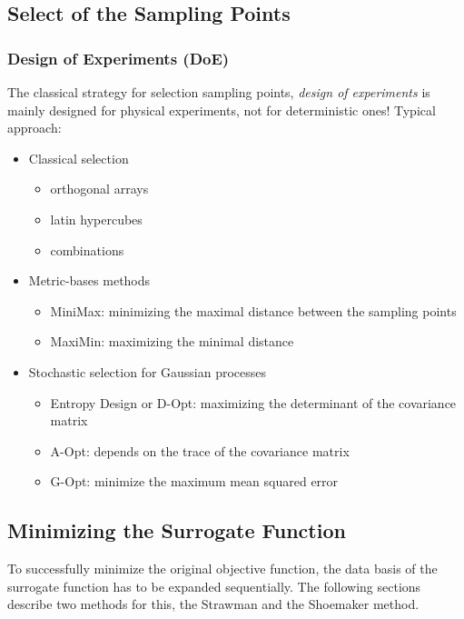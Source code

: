 		\subsection{Select of the Sampling Points}
			\subsubsection{Design of Experiments (DoE)}
				The classical strategy for selection sampling points, \emph{design of experiments} is mainly designed for physical experiments, not for deterministic ones! Typical approach:
				\begin{itemize}
					\item Classical selection
						\begin{itemize}
							\item orthogonal arrays
							\item latin hypercubes
							\item combinations
						\end{itemize}
					\item Metric-bases methods
						\begin{itemize}
							\item MiniMax: minimizing the maximal distance between the sampling points
							\item MaxiMin: maximizing the minimal distance
						\end{itemize}
					\item Stochastic selection for Gaussian processes
						\begin{itemize}
							\item Entropy Design or D-Opt: maximizing the determinant of the covariance matrix
							\item A-Opt: depends on the trace of the covariance matrix
							\item G-Opt: minimize the maximum mean squared error
						\end{itemize}
				\end{itemize}

		\subsection{Minimizing the Surrogate Function}
			To successfully minimize the original objective function, the data basis of the surrogate function has to be expanded sequentially. The following sections describe two methods for this, the Strawman and the Shoemaker method.

